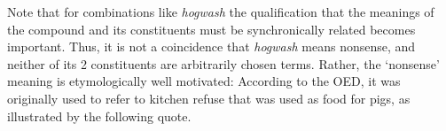 







Note that for combinations like \emph{hogwash} the qualification that the meanings of the compound and its
constituents must be synchronically related becomes important. Thus, it is not a coincidence
that \emph{hogwash} means nonsense, and neither of its 2 constituents are
arbitrarily chosen terms. Rather, the `nonsense' meaning is etymologically
well motivated: According to the
 OED, it was originally used to refer to kitchen refuse that was used as food
 for pigs, as illustrated by the following quote.

